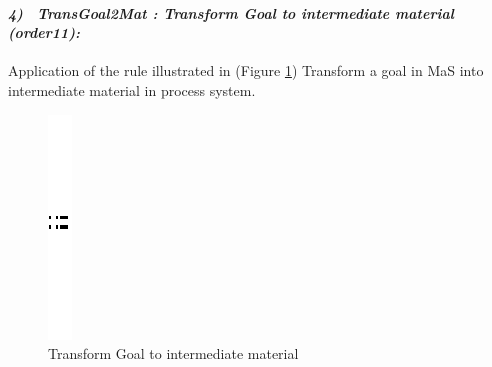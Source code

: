 \paragraph{\emph{4)~ TransGoal2Mat : Transform Goal to intermediate material (order11):} }
Application of the rule illustrated in (Figure \ref{fig:Transform Goal to intermediate material}) Transform a goal in MaS into intermediate material in process system.
 
\begin{figure}[th]
\centering 
	\quad{}
		\includegraphics{ch3/img/sep}
	\quad{}
\caption{\label{fig:Transform Goal to intermediate material}Transform Goal to intermediate material}
 
\end{figure} 
\vspace{1cm}
